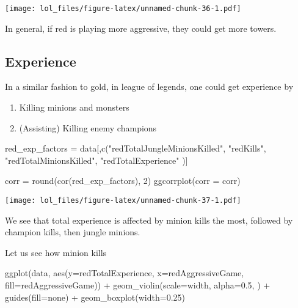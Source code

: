 \documentclass[
]{article}
\newenvironment{Shaded}{\begin{snugshade}}{\end{snugshade}}
\newcommand{\AttributeTok}[1]{\textcolor[rgb]{0.77,0.63,0.00}{#1}}
\newcommand{\DecValTok}[1]{\textcolor[rgb]{0.00,0.00,0.81}{#1}}
\newcommand{\FloatTok}[1]{\textcolor[rgb]{0.00,0.00,0.81}{#1}}
\newcommand{\FunctionTok}[1]{\textcolor[rgb]{0.00,0.00,0.00}{#1}}
\newcommand{\NormalTok}[1]{#1}
\newcommand{\OtherTok}[1]{\textcolor[rgb]{0.56,0.35,0.01}{#1}}
\newcommand{\SpecialCharTok}[1]{\textcolor[rgb]{0.00,0.00,0.00}{#1}}
\newcommand{\StringTok}[1]{\textcolor[rgb]{0.31,0.60,0.02}{#1}}
\begin{document}
\texttt{[image: lol\_files/figure-latex/unnamed-chunk-36-1.pdf]}

In general, if red is playing more aggressive, they could get more
towers.

\hypertarget{experience-1}{%
\subsection{Experience}\label{experience-1}}

In a similar fashion to gold, in league of legends, one could get
experience by

\begin{enumerate}
\def\labelenumi{\arabic{enumi}.}
\item
  Killing minions and monsters
\item
  (Assisting) Killing enemy champions
\end{enumerate}

\begin{Shaded}
\begin{Highlighting}[]
\NormalTok{red\_exp\_factors }\OtherTok{=}\NormalTok{ data[,}\FunctionTok{c}\NormalTok{(}\StringTok{"redTotalJungleMinionsKilled"}\NormalTok{, }
                            \StringTok{"redKills"}\NormalTok{,}
                            \StringTok{"redTotalMinionsKilled"}\NormalTok{,}
                            \StringTok{"redTotalExperience"}
\NormalTok{                            )]}

\NormalTok{corr }\OtherTok{=} \FunctionTok{round}\NormalTok{(}\FunctionTok{cor}\NormalTok{(red\_exp\_factors), }\DecValTok{2}\NormalTok{)}
\FunctionTok{ggcorrplot}\NormalTok{(}\AttributeTok{corr =}\NormalTok{ corr)}
\end{Highlighting}
\end{Shaded}

\texttt{[image: lol\_files/figure-latex/unnamed-chunk-37-1.pdf]}

We see that total experience is affected by minion kills the most,
followed by champion kills, then jungle minions.

Let us see how minion kills

\begin{Shaded}
\begin{Highlighting}[]
\FunctionTok{ggplot}\NormalTok{(data, }\FunctionTok{aes}\NormalTok{(}\AttributeTok{y=}\NormalTok{redTotalExperience, }\AttributeTok{x=}\NormalTok{redAggressiveGame, }\AttributeTok{fill=}\NormalTok{redAggressiveGame)) }\SpecialCharTok{+} 
  \FunctionTok{geom\_violin}\NormalTok{(}\AttributeTok{scale=}\StringTok{\textquotesingle{}width\textquotesingle{}}\NormalTok{, }\AttributeTok{alpha=}\FloatTok{0.5}\NormalTok{, ) }\SpecialCharTok{+}
  \FunctionTok{guides}\NormalTok{(}\AttributeTok{fill=}\StringTok{\textquotesingle{}none\textquotesingle{}}\NormalTok{) }\SpecialCharTok{+} 
  \FunctionTok{geom\_boxplot}\NormalTok{(}\AttributeTok{width=}\FloatTok{0.25}\NormalTok{)}
\end{Highlighting}
\end{Shaded}
\end{document}
